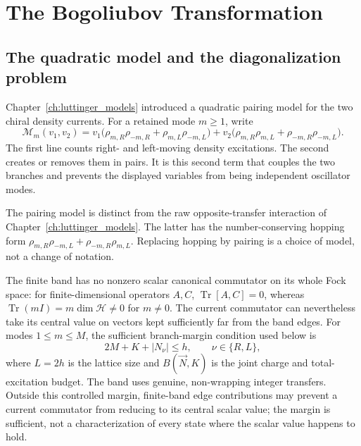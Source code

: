 \chapter{The Bogoliubov Transformation}
\label{ch:bogoliubov}

\section{The quadratic model and the diagonalization problem}

Chapter~\ref{ch:luttinger_models} introduced a quadratic pairing model for the two chiral density currents. For a retained mode $m\geq1$, write
\begin{equation}
  \mathcal M_m(v_1,v_2)
  =v_1\bigl(\rho_{m,R}\rho_{-m,R}+\rho_{m,L}\rho_{-m,L}\bigr)
   +v_2\bigl(\rho_{m,R}\rho_{m,L}+\rho_{-m,R}\rho_{-m,L}\bigr).
  \label{eq:ch18-pairing-mode}
\end{equation}
The first line counts right- and left-moving density excitations. The second creates or removes them in pairs. It is this second term that couples the two branches and prevents the displayed variables from being independent oscillator modes.

The pairing model is distinct from the raw opposite-transfer interaction of Chapter~\ref{ch:luttinger_models}. The latter has the number-conserving hopping form $\rho_{m,R}\rho_{-m,L}+\rho_{-m,R}\rho_{m,L}$. Replacing hopping by pairing is a choice of model, not a change of notation.

The finite band has no nonzero scalar canonical commutator on its whole Fock space: for finite-dimensional operators $A,C$, $\operatorname{Tr}[A,C]=0$, whereas $\operatorname{Tr}(mI)=m\dim\mathcal H\ne0$ for $m\ne0$. The current commutator can nevertheless take its central value on vectors kept sufficiently far from the band edges. For modes $1\leq m\leq M$, the sufficient branch-margin condition used below is
\begin{equation}
  2M+K+|N_\nu|\leq h,\qquad \nu\in\{R,L\},
  \label{eq:ch18-branch-margin}
\end{equation}
where $L=2h$ is the lattice size and $B(\vec N,K)$ is the joint charge and total-excitation budget. The band uses genuine, non-wrapping integer transfers. Outside this controlled margin, finite-band edge contributions may prevent a current commutator from reducing to its central scalar value; the margin is sufficient, not a characterization of every state where the scalar value happens to hold.


